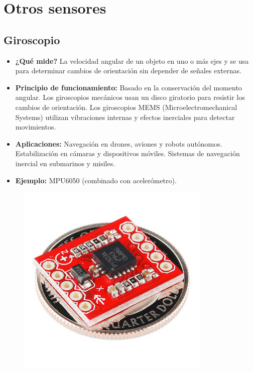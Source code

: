 \section{Otros sensores}

\subsection*{Giroscopio}
\begin{itemize}
	\item \textbf{¿Qué mide?} La velocidad angular de un objeto en uno o más ejes y se usa para determinar cambios de orientación sin depender de señales externas.
	\item \textbf{Principio de funcionamiento:} Basado en la conservación del momento angular.
	Los giroscopios mecánicos usan un disco giratorio para resistir los cambios de orientación.
	Los giroscopios MEMS (Microelectromechanical Systems) utilizan vibraciones internas y efectos inerciales para detectar movimientos.
	
	\item \textbf{Aplicaciones:} Navegación en drones, aviones y robots autónomos.
	Estabilización en cámaras y dispositivos móviles.
	Sistemas de navegación inercial en submarinos y misiles.
	\item \textbf{Ejemplo:} MPU6050 (combinado con acelerómetro).
\end{itemize}
\begin{figure}[h]
	\centering
	\includegraphics[width=0.3\linewidth]{img/giroscopio}
	\label{fig:giroscopio}
\end{figure}

